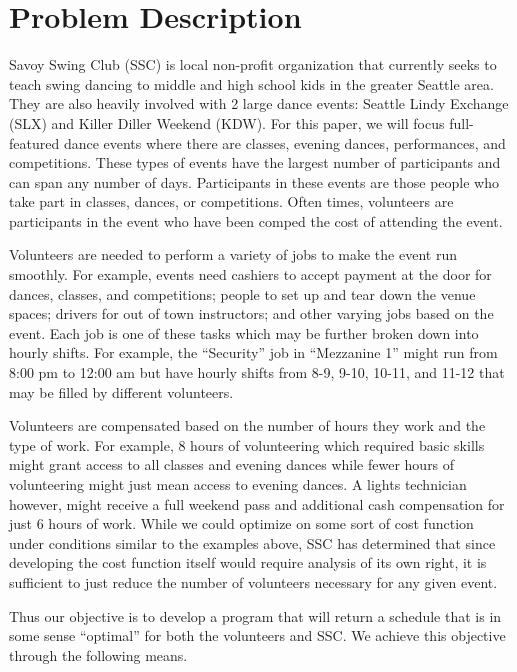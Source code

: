 \documentclass[11pt]{article}
\theoremstyle{definition}
\begin{document}
\section{Problem Description}
\begin{multicols}{2}
Savoy Swing Club (SSC) is local non-profit organization that currently seeks to teach swing dancing to middle and high school kids in the greater Seattle area.
They are also heavily involved with 2 large dance events: Seattle Lindy Exchange (SLX) and Killer Diller Weekend (KDW). For this paper, we will focus full-featured dance events where there are classes, evening dances, performances, and competitions.
These types of events have the largest number of participants and can span any number of days.
Participants in these events are those people who take part in classes, dances, or competitions.
Often times, volunteers are participants in the event who have been comped the cost of attending the event.

Volunteers are needed to perform a variety of jobs to make the event run smoothly.
For example, events need cashiers to accept payment at the door for dances, classes, and competitions; people to set up and tear down the venue spaces; drivers for out of town instructors; and other varying jobs based on the event.
Each job is one of these tasks which may be further broken down into hourly shifts.
For example, the ``Security'' job in ``Mezzanine 1'' might run from 8:00 pm to 12:00 am but have hourly shifts from 8-9, 9-10, 10-11, and 11-12 that may be filled by different volunteers.

Volunteers are compensated based on the number of hours they work and the type of work.
For example, 8 hours of volunteering which required basic skills might grant access to all classes and evening dances while fewer hours of volunteering might just mean access to evening dances.
A lights technician however, might receive a full weekend pass and additional cash compensation for just 6 hours of work.
While we could optimize on some sort of cost function under conditions similar to the examples above, SSC has determined that since developing the cost function itself would require analysis of its own right, it is sufficient to just reduce the number of volunteers necessary for any given event.

Thus our objective is to develop a program that will return a schedule that is in some sense ``optimal'' for both the volunteers and SSC. 
We achieve this objective through the following means.


\end{multicols}
\end{document}

